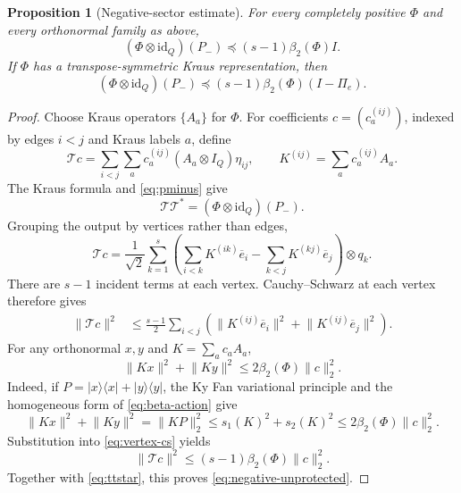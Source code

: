\documentclass[11pt,reqno]{amsart}
\newtheorem{proposition}[theorem]{Proposition}
\theoremstyle{remark}
\newcommand{\id}{\mathrm{id}}
\newcommand{\norm}[1]{\lVert #1\rVert}
\newcommand{\ketbra}[2]{\lvert #1\rangle\!\langle #2\rvert}
\newcommand{\preceqop}{\mathrel{\preceq}}
\begin{document}
\begin{proposition}[Negative-sector estimate]
\label{prop:negative}
For every completely positive $\Phi$ and every orthonormal family as above,
\begin{equation}
\label{eq:negative-unprotected}
  (\Phi\otimes\id_Q)(P_-)
  \preceqop (s-1)\beta_2(\Phi)I.
\end{equation}
If $\Phi$ has a transpose-symmetric Kraus representation, then
\begin{equation}
\label{eq:negative-protected}
  (\Phi\otimes\id_Q)(P_-)
  \preceqop (s-1)\beta_2(\Phi)(I-\Pi_e).
\end{equation}
\end{proposition}

\begin{proof}
Choose Kraus operators $\{A_a\}$ for $\Phi$.  For coefficients
$c=(c_a^{(ij)})$, indexed by edges $i<j$ and Kraus labels $a$, define
\[
  \mathcal Tc
  =\sum_{i<j}\sum_a c_a^{(ij)}
     (A_a\otimes I_Q)\eta_{ij},
  \qquad
  K^{(ij)}=\sum_a c_a^{(ij)}A_a.
\]
The Kraus formula and \cref{eq:pminus} give
\begin{equation}
\label{eq:ttstar}
  \mathcal T\mathcal T^*=(\Phi\otimes\id_Q)(P_-).
\end{equation}
Grouping the output by vertices rather than edges,
\begin{equation}
\label{eq:vertex-group}
  \mathcal Tc
  =\frac1{\sqrt2}\sum_{k=1}^s
   \left(
      \sum_{i<k}K^{(ik)}\overline e_i
      -\sum_{k<j}K^{(kj)}\overline e_j
   \right)\otimes q_k.
\end{equation}
There are $s-1$ incident terms at each vertex.  Cauchy--Schwarz at each
vertex therefore gives
\begin{align}
  \norm{\mathcal Tc}^2
  &\le\frac{s-1}{2}
    \sum_{i<j}
       \left(
         \norm{K^{(ij)}\overline e_i}^2+
         \norm{K^{(ij)}\overline e_j}^2
       \right).
\label{eq:vertex-cs}
\end{align}
For any orthonormal $x,y$ and $K=\sum_ac_aA_a$,
\begin{equation}
\label{eq:pair-action}
  \norm{Kx}^2+\norm{Ky}^2
  \le 2\beta_2(\Phi)\norm c_2^2.
\end{equation}
Indeed, if $P=\ketbra{x}{x}+\ketbra{y}{y}$, the Ky Fan variational
principle and the homogeneous form of \cref{eq:beta-action} give
\[
  \norm{Kx}^2+\norm{Ky}^2
  =\norm{KP}_2^2
  \le s_1(K)^2+s_2(K)^2
  \le2\beta_2(\Phi)\norm c_2^2.
\]
Substitution into \cref{eq:vertex-cs} yields
\begin{equation}
\label{eq:Tnorm}
  \norm{\mathcal Tc}^2
  \le(s-1)\beta_2(\Phi)\norm c_2^2.
\end{equation}
Together with \cref{eq:ttstar}, this proves
\cref{eq:negative-unprotected}.


\end{proof}
\end{document}
